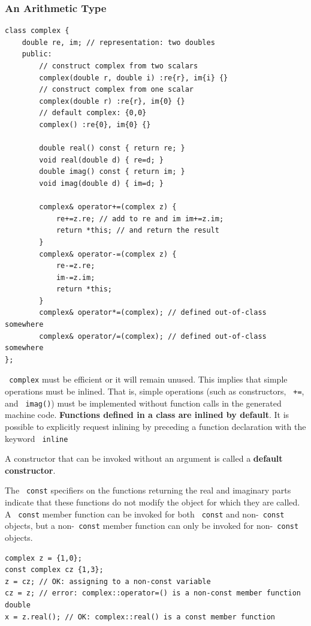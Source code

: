 \documentclass[11pt]{article}
\let\OldTexttt\texttt
\renewcommand{\texttt}[1]{\OldTexttt{\color{MidnightBlue} #1}}
\begin{document}
\subsubsection{An Arithmetic Type}
\label{sec:orgfb274ff}
\begin{verbatim}
class complex {
    double re, im; // representation: two doubles
    public:
        // construct complex from two scalars
        complex(double r, double i) :re{r}, im{i} {}
        // construct complex from one scalar
        complex(double r) :re{r}, im{0} {}
        // default complex: {0,0}
        complex() :re{0}, im{0} {}
        
        double real() const { return re; }
        void real(double d) { re=d; }
        double imag() const { return im; }
        void imag(double d) { im=d; }
        
        complex& operator+=(complex z) {
            re+=z.re; // add to re and im im+=z.im;
            return *this; // and return the result
        }
        complex& operator-=(complex z) {
            re-=z.re;
            im-=z.im;
            return *this;
        }
        complex& operator*=(complex); // defined out-of-class somewhere
        complex& operator/=(complex); // defined out-of-class somewhere
};
\end{verbatim}

\texttt{complex} must be efficient or it will remain unused. This implies that simple operations must be
inlined. That is, simple operations (such as constructors, \texttt{+=}, and \texttt{imag()}) must be implemented
without function calls in the generated machine code. \textbf{Functions defined in a class are inlined
by default}. It is possible to explicitly request inlining by preceding a function declaration
with the keyword \texttt{inline}

A constructor that can be invoked without an argument is called a \textbf{default constructor}.

The \texttt{const} specifiers on the functions returning the real and imaginary parts indicate that these
functions do not modify the object for which they are called. A \texttt{const} member function can be
invoked for both \texttt{const} and non-\texttt{const} objects, but a non-\texttt{const} member function can only be
invoked for non-\texttt{const} objects.

\begin{verbatim}
complex z = {1,0};
const complex cz {1,3};
z = cz; // OK: assigning to a non-const variable
cz = z; // error: complex::operator=() is a non-const member function double
x = z.real(); // OK: complex::real() is a const member function
\end{verbatim}
\end{document}
